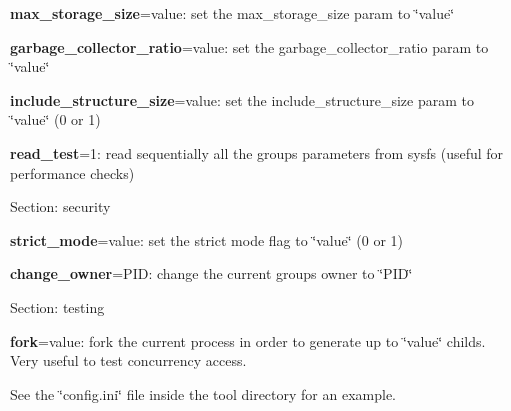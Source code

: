 \begin{DoxyItemize}
\begin{DoxyEnumerate}
\item {\bfseries{max\+\_\+storage\+\_\+size}}=value\+: set the \textquotesingle{}max\+\_\+storage\+\_\+size\textquotesingle{} param to \char`\"{}value\char`\"{}
\item {\bfseries{garbage\+\_\+collector\+\_\+ratio}}=value\+: set the \textquotesingle{}garbage\+\_\+collector\+\_\+ratio\textquotesingle{} param to \char`\"{}value\char`\"{}
\item {\bfseries{include\+\_\+structure\+\_\+size}}=value\+: set the \textquotesingle{}include\+\_\+structure\+\_\+size\textquotesingle{} param to \char`\"{}value\char`\"{} (0 or 1)
\item {\bfseries{read\+\_\+test}}=1\+: read sequentially all the group\textquotesingle{}s parameters from sysfs (useful for performance checks)
\end{DoxyEnumerate}
\item Section\+: security
\begin{DoxyEnumerate}
\item {\bfseries{strict\+\_\+mode}}=value\+: set the strict mode flag to \char`\"{}value\char`\"{} (0 or 1)
\item {\bfseries{change\+\_\+owner}}=P\+ID\+: change the current group\textquotesingle{}s owner to \char`\"{}\+P\+I\+D\char`\"{}
\end{DoxyEnumerate}
\item Section\+: testing
\begin{DoxyEnumerate}
\item {\bfseries{fork}}=value\+: fork the current process in order to generate up to \char`\"{}value\char`\"{} childs. Very useful to test concurrency access.
\end{DoxyEnumerate}
\end{DoxyItemize}

See the \char`\"{}config.\+ini\char`\"{} file inside the tool directory for an example. 